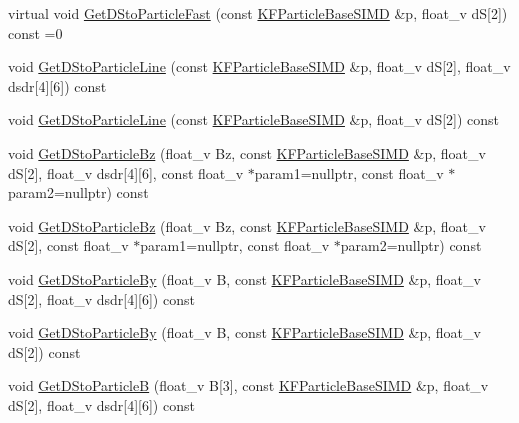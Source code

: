 \begin{DoxyCompactItemize}
\item 
virtual void \hyperlink{classKFParticleBaseSIMD_afeee016bf203bca0bd17959509541334}{Get\+D\+Sto\+Particle\+Fast} (const \hyperlink{classKFParticleBaseSIMD}{K\+F\+Particle\+Base\+S\+I\+MD} \&p, float\+\_\+v dS\mbox{[}2\mbox{]}) const =0
\item 
void \hyperlink{classKFParticleBaseSIMD_a8e96d6b648dbc125f44f3a6e54844df7}{Get\+D\+Sto\+Particle\+Line} (const \hyperlink{classKFParticleBaseSIMD}{K\+F\+Particle\+Base\+S\+I\+MD} \&p, float\+\_\+v dS\mbox{[}2\mbox{]}, float\+\_\+v dsdr\mbox{[}4\mbox{]}\mbox{[}6\mbox{]}) const 
\item 
void \hyperlink{classKFParticleBaseSIMD_a9a7028feaf50340f96452a3fa75159e0}{Get\+D\+Sto\+Particle\+Line} (const \hyperlink{classKFParticleBaseSIMD}{K\+F\+Particle\+Base\+S\+I\+MD} \&p, float\+\_\+v dS\mbox{[}2\mbox{]}) const 
\item 
void \hyperlink{classKFParticleBaseSIMD_af48beb91cdace844ed70ae927d31c96e}{Get\+D\+Sto\+Particle\+Bz} (float\+\_\+v Bz, const \hyperlink{classKFParticleBaseSIMD}{K\+F\+Particle\+Base\+S\+I\+MD} \&p, float\+\_\+v dS\mbox{[}2\mbox{]}, float\+\_\+v dsdr\mbox{[}4\mbox{]}\mbox{[}6\mbox{]}, const float\+\_\+v $\ast$param1=nullptr, const float\+\_\+v $\ast$param2=nullptr) const 
\item 
void \hyperlink{classKFParticleBaseSIMD_a067e1b2914968999024912bbe1b741ef}{Get\+D\+Sto\+Particle\+Bz} (float\+\_\+v Bz, const \hyperlink{classKFParticleBaseSIMD}{K\+F\+Particle\+Base\+S\+I\+MD} \&p, float\+\_\+v dS\mbox{[}2\mbox{]}, const float\+\_\+v $\ast$param1=nullptr, const float\+\_\+v $\ast$param2=nullptr) const 
\item 
void \hyperlink{classKFParticleBaseSIMD_a807794fa31286b74663338e91a515e28}{Get\+D\+Sto\+Particle\+By} (float\+\_\+v B, const \hyperlink{classKFParticleBaseSIMD}{K\+F\+Particle\+Base\+S\+I\+MD} \&p, float\+\_\+v dS\mbox{[}2\mbox{]}, float\+\_\+v dsdr\mbox{[}4\mbox{]}\mbox{[}6\mbox{]}) const 
\item 
void \hyperlink{classKFParticleBaseSIMD_a53e483c36be41f4b2b31167079448c50}{Get\+D\+Sto\+Particle\+By} (float\+\_\+v B, const \hyperlink{classKFParticleBaseSIMD}{K\+F\+Particle\+Base\+S\+I\+MD} \&p, float\+\_\+v dS\mbox{[}2\mbox{]}) const 
\item 
void \hyperlink{classKFParticleBaseSIMD_af18dabf64aa93effd00e8ef3187df1e8}{Get\+D\+Sto\+ParticleB} (float\+\_\+v B\mbox{[}3\mbox{]}, const \hyperlink{classKFParticleBaseSIMD}{K\+F\+Particle\+Base\+S\+I\+MD} \&p, float\+\_\+v dS\mbox{[}2\mbox{]}, float\+\_\+v dsdr\mbox{[}4\mbox{]}\mbox{[}6\mbox{]}) const 

\end{DoxyCompactItemize}
